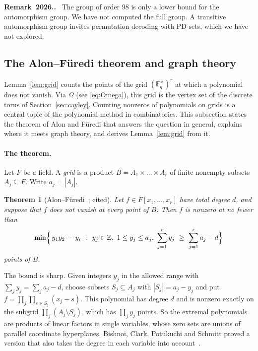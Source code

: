 \documentclass[12pt,letterpaper]{article}
\numberwithin{equation}{section}
\newtheorem{theorem}{Theorem}[section]
\theoremstyle{definition}
\theoremstyle{remark}
\newcounter{remxxvi}
\renewcommand{\theremxxvi}{2026.\arabic{remxxvi}}
\newenvironment{remarkxxvi}{\refstepcounter{remxxvi}\par\medskip\noindent
  \textbf{Remark~\theremxxvi.}\ }{\par\medskip}
\newcommand{\Z}{\mathbb{Z}}
\newcommand{\Fqs}{\mathbb{F}_q^{\times}}
\begin{document}
\begin{remarkxxvi}\label{rem:aut}
The group of order $98$ is only a lower bound for the automorphism group. We
have not computed the full group. A transitive automorphism group invites
permutation decoding with PD-sets, which we have not explored.
\end{remarkxxvi}

\subsection{The Alon--F\"uredi theorem and graph theory}\label{sec:nullstellensatz}

Lemma~\ref{lem:grid} counts the points of the grid $(\Fqs)^r$ at which a
polynomial does not vanish. Via $\Omega$ (see \eqref{eq:Omega}), this grid is
the vertex set of the
discrete torus of Section~\ref{sec:cayley}. Counting nonzeros of polynomials
on grids is a central topic of the polynomial method in combinatorics. This
subsection states the theorem of Alon and F\"uredi that answers the question
in general, explains where it meets graph theory, and derives
Lemma~\ref{lem:grid} from it.

\paragraph{The theorem.}
Let $F$ be a field. A \emph{grid} is a product $B=A_1\times\dots\times A_r$ of
finite nonempty subsets $A_j\subseteq F$. Write $a_j=|A_j|$.

\begin{theorem}[{Alon--F\"uredi~\cite[Thm.~5]{AF93}; cited}]\label{thm:AF}
Let $f\in F[x_1,\dots,x_r]$ have total degree $d$, and suppose that $f$ does
not vanish at every point of $B$. Then $f$ is nonzero at no fewer than
\[
\min\Bigl\{\,y_1y_2\cdots y_r\ :\ y_j\in\Z,\ 1\le y_j\le a_j,\
\sum_{j=1}^r y_j\ \ge\ \sum_{j=1}^r a_j-d\Bigr\}
\]
points of $B$.
\end{theorem}

The bound is sharp. Given integers $y_j$ in the allowed range with
$\sum_j y_j=\sum_j a_j-d$, choose subsets $S_j\subseteq A_j$ with
$|S_j|=a_j-y_j$ and put $f=\prod_j\prod_{s\in S_j}(x_j-s)$. This polynomial
has degree $d$ and is nonzero exactly on the subgrid
$\prod_j(A_j\setminus S_j)$, which has $\prod_jy_j$ points. So the extremal
polynomials are products of linear factors in single variables, whose zero
sets are unions of parallel coordinate hyperplanes. Bishnoi, Clark,
Potukuchi and Schmitt proved a version that also takes the degree in each
variable into account~\cite{BCPS18}.
\end{document}
